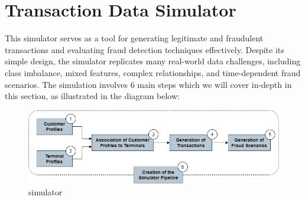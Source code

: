     \hypertarget{transaction-data-simulator}{%
\section{Transaction Data Simulator}\label{transaction-data-simulator}}

    This simulator serves as a tool for generating legitimate and fraudulent
transactions and evaluating fraud detection techniques effectively.
Despite its simple design, the simulator replicates many real-world data
challenges, including class imbalance, mixed features, complex
relationships, and time-dependent fraud scenarios. The simulation
involves 6 main steps which we will cover in-depth in this section, as
illustrated in the diagram below:

\begin{figure}
\centering
\includegraphics{images/simulator.png}
\caption{simulator}
\end{figure}

